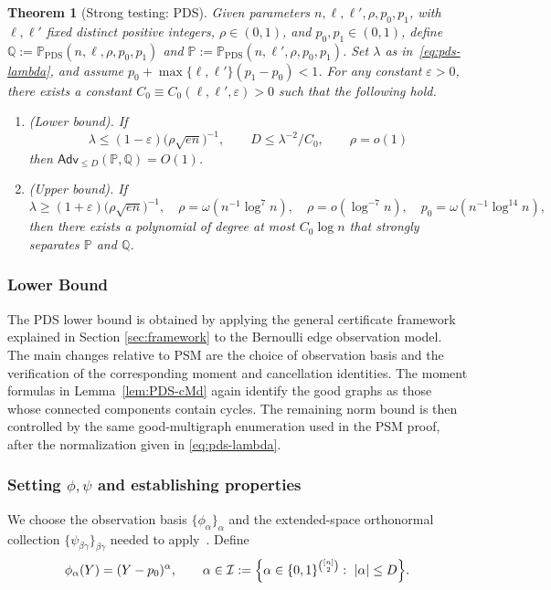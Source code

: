 \documentclass[11pt, letterpaper]{article}
\newtheorem{theorem}{Theorem}[section]
\numberwithin{equation}{section}
\newcommand{\Adv}{\mathsf{Adv}}
\newcommand{\cI}{\mathcal{I}}
\newcommand{\PP}{\mathbb{P}}
\newcommand{\QQ}{\mathbb{Q}}
\begin{document}
\begin{theorem}[Strong testing: PDS]\label{thm:strong_PDS}
Given parameters $n,\ell,\ell',\rho,p_0,p_1$, with
$\ell,\ell'$ fixed distinct positive integers, $\rho\in(0,1)$, and
$p_0,p_1\in(0,1)$, define
$\QQ:=\mathbb{P}_{\mathrm{PDS}}(n,\ell,\rho,p_0,p_1)$ and
$\PP:=\mathbb{P}_{\mathrm{PDS}}(n,\ell',\rho,p_0,p_1)$.
Set $\lambda$ as in~\eqref{eq:pds-lambda}, and assume
$p_0+\max\{\ell,\ell'\}(p_1-p_0)<1$. For any constant $\varepsilon>0$, there exists a constant $C_0\equiv C_0(\ell,\ell',\varepsilon)>0$ such that the following hold.
\begin{enumerate}
  \item[(i)] \emph{(Lower bound)}. If
  \[
  \lambda \le (1-\varepsilon)\big(\rho\sqrt{en}\big)^{-1},
  \qquad
  D \le \lambda^{-2}/C_0, \qquad \rho=o(1)
  \]
  then $\Adv_{\le D}(\PP,\QQ)=O(1)$.

  \item[(ii)] \emph{(Upper bound)}. If
  \[
  \lambda \ge (1+\varepsilon)\big(\rho\sqrt{en}\big)^{-1},
  \quad
  \rho=\omega(n^{-1}\log^7 n),
  \quad
  \rho=o(\log^{-7}n),
  \quad
  p_0=\omega(n^{-1}\log^{14}n),
  \]
 then there exists a polynomial of degree at most $C_0\log n$ that strongly separates $\mathbb{P}$ and $\mathbb{Q}$.
\end{enumerate}
\end{theorem}


\subsubsection{Lower Bound}\label{app:PDS:lower-bound}
The PDS lower bound is obtained by applying the general certificate framework explained in Section \ref{sec:framework} to the Bernoulli edge observation model. The main changes relative to PSM are the choice of observation basis and the verification of the corresponding moment and
cancellation identities. The moment formulas in Lemma~\ref{lem:PDS-cMd} again identify the good graphs as those whose connected components contain cycles. The remaining norm bound is then controlled by the same good-multigraph enumeration used in the PSM proof, after the normalization given in \eqref{eq:pds-lambda}.
\subsubsection*{Setting $\phi, \psi$ and establishing properties}
We choose the observation basis $\{\phi_\alpha\}_\alpha$ and the extended-space orthonormal collection $\{\psi_{\beta\gamma}\}_{\beta\gamma}$ needed to apply~. Define
\begin{equation}\label{eq:phi_def_PDS}
\phi_\alpha(Y)=(Y-p_0)^\alpha, \qquad \alpha \in \cI:=\Bigl\{\alpha\in\{0,1\}^{\binom{[n]}{2}}:\ |\alpha|\le D\Bigr\}.
\end{equation}
\end{document}
